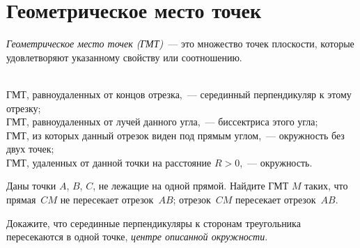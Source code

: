 
\section*{Геометрическое место точек}


\emph{Геометрическое место точек (ГМТ)}~--- это множество точек плоскости,
которые удовлетворяют указанному свойству или соотношению.

\\
ГМТ, равноудаленных от концов отрезка,~--- серединный перпендикуляр к этому
отрезку;
\\
ГМТ, равноудаленных от лучей данного угла,~--- биссектриса этого угла;
\\
ГМТ, из которых данный отрезок виден под прямым углом,~--- окружность без двух
точек;
\\
ГМТ, удаленных от данной точки на расстояние $R > 0$,~--- окружность.

Даны точки $A$, $B$, $C$, не лежащие на одной прямой.
Найдите ГМТ $M$ таких, что
\\
\subproblem
прямая~$CM$ не пересекает отрезок~$AB$;
\quad
\subproblem
отрезок~$CM$ пересекает отрезок~$AB$.

Докажите, что серединные перпендикуляры к сторонам треугольника пересекаются
в одной точке, \emph{центре описанной окружности}.

